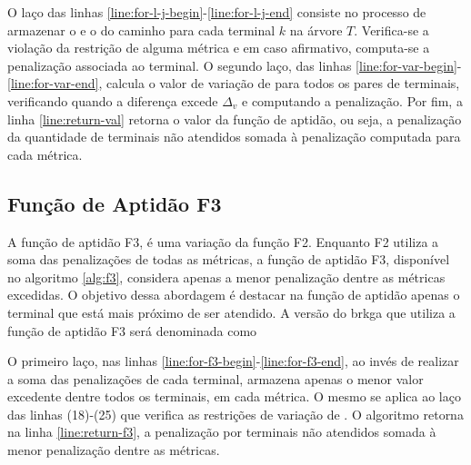O laço  das linhas  \eqref{line:for-l-j-begin}-\eqref{line:for-l-j-end} consiste
no processo de armazenar o {\delay} e  o {\jitter} do caminho para cada terminal
$k$ na árvore  $T$. Verifica-se a violação  da restrição de alguma  métrica e em
caso afirmativo, computa-se a penalização associada ao terminal. O segundo laço,
das linhas \eqref{line:for-var-begin}-\eqref{line:for-var-end},  calcula o valor
de variação de  {\delay} para todos os pares de  terminais, verificando quando a
diferença  excede  $\Delta_v$ e  computando  a  penalização.  Por fim,  a  linha
\eqref{line:return-val}  retorna  o valor  da  função  de  aptidão, ou  seja,  a
penalização  da  quantidade de  terminais  não  atendidos somada  à  penalização
computada para cada métrica.

\subsection{Função de Aptidão F3} \label{subsec:brkga-f3}

A função de aptidão F3, é uma variação  da função F2. Enquanto F2 utiliza a soma
das penalizações  de todas as  métricas, a função  de aptidão F3,  disponível no
algoritmo \ref{alg:f3}, considera apenas a  menor penalização dentre as métricas
excedidas. O objetivo  dessa abordagem é destacar na função  de aptidão apenas o
terminal que  está mais  próximo de  ser atendido. A  versão do  \gls{brkga} que
utiliza a função de aptidão F3 será denominada como {\bftres}

O primeiro  laço, nas  linhas \eqref{line:for-f3-begin}-\eqref{line:for-f3-end},
ao invés de realizar a soma das penalizações de cada terminal, armazena apenas o
menor valor  excedente dentre todos  os terminais, em  cada métrica. O  mesmo se
aplica ao  laço das linhas (18)-(25)  que verifica as restrições  de variação de
{\delay}. O algoritmo retorna na linha \eqref{line:return-f3}, a penalização por
terminais não atendidos somada à menor penalização dentre as métricas.

